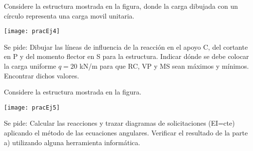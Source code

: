 \ejercicio
%
Considere la estructura mostrada en la figura, donde la carga dibujada con un círculo representa una carga movil unitaria.
%
\begin{center}
	\texttt{[image: pracEj4]}
\end{center}
%
\noindent
Se pide:
\parte Dibujar las líneas de influencia de la reacción en el apoyo C, del cortante en P y del momento flector en S para la estructura.
\parte Indicar dónde se debe colocar la carga uniforme $q=20$ kN/m para que RC, VP y MS sean máximos y mínimos. Encontrar dichos valores.
%



\ejercicio
Considere la estructura mostrada en la figura.
%
\begin{center}
	\texttt{[image: pracEj5]}
\end{center}
%
\noindent
Se pide:
\parte Calcular las reacciones y trazar diagramas de solicitaciones (EI=cte) aplicando el método de las ecuaciones angulares. 
\parte Verificar el resultado de la parte a) utilizando alguna herramienta informática.

